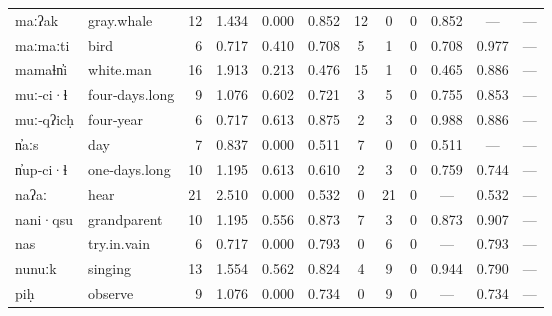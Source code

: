 \begin{landscape}
\begin{longtable}[c]{ l l | r r c c | c c c | c c c }
  maːʔak             & gray.whale                & 12  & 1.434                     & 0.000           & 0.852      & 12        & 0           & 0            & 0.852     & —           & —\\
  maːmaːti           & bird                      & 6   & 0.717                     & 0.410           & 0.708      & 5         & 1           & 0            & 0.708     & 0.977       & —\\
  mamaɬn̓i            & white.man                 & 16  & 1.913                     & 0.213           & 0.476      & 15        & 1           & 0            & 0.465     & 0.886       & —\\
  muː‑ci·ɬ           & four‑days.long            & 9   & 1.076                     & 0.602           & 0.721      & 3         & 5           & 0            & 0.755     & 0.853       & —\\
  muː‑qʔicḥ          & four‑year                 & 6   & 0.717                     & 0.613           & 0.875      & 2         & 3           & 0            & 0.988     & 0.886       & —\\
  n̓aːs               & day                       & 7   & 0.837                     & 0.000           & 0.511      & 7         & 0           & 0            & 0.511     & —           & —\\
  n̓up‑ci·ɬ           & one‑days.long             & 10  & 1.195                     & 0.613           & 0.610      & 2         & 3           & 0            & 0.759     & 0.744       & —\\
  naʔaː              & hear                      & 21  & 2.510                     & 0.000           & 0.532      & 0         & 21          & 0            & —         & 0.532       & —\\
  nani·qsu           & grandparent               & 10  & 1.195                     & 0.556           & 0.873      & 7         & 3           & 0            & 0.873     & 0.907       & —\\
  nas                & try.in.vain               & 6   & 0.717                     & 0.000           & 0.793      & 0         & 6           & 0            & —         & 0.793       & —\\
  nunuːk             & singing                   & 13  & 1.554                     & 0.562           & 0.824      & 4         & 9           & 0            & 0.944     & 0.790       & —\\
  piḥ                & observe                   & 9   & 1.076                     & 0.000           & 0.734      & 0         & 9           & 0            & —         & 0.734       & —\\

\end{longtable}
\end{landscape}
